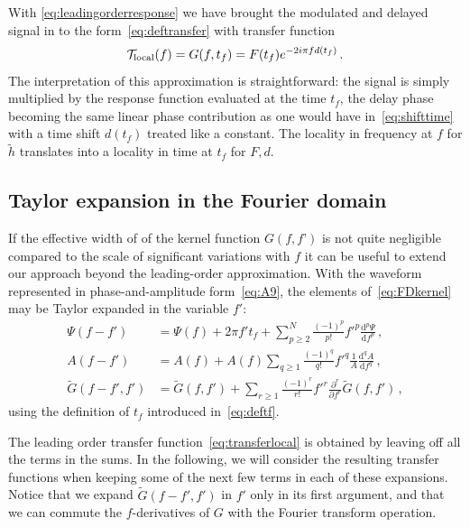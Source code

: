 \documentclass[aps,showpacs,twocolumn,
prd,superscriptaddress,nofootinbib]{revtex4-1}
\newcommand{\be}{\begin{equation}}
\newcommand{\ee}{\end{equation}}
\newcommand\ud{{\mathrm{d}}}
\newcommand\calT{{\mathcal{T}}}
\newcommand{\tf}{t_{f}}
\newcommand{\jgb}[1]{{\color{DarkGreen} #1}}
\begin{document}
\jgb{With \eqref{eq:leadingorderresponse} we have brought the modulated and delayed signal in to the form~\eqref{eq:deftransfer} with transfer function}
\be\label{eq:transferlocal}
	\calT_{\rm local}(f) = G(f, \tf) = F(t_{f}) e^{-2i\pi f d(t_{f})}\,.
\ee
The interpretation of this approximation is straightforward: the signal is simply multiplied by the response function evaluated at the time $\tf$, the delay phase becoming the same linear phase contribution as one would have in~\eqref{eq:shifttime} with a time shift $d(t_{f})$ treated like a constant. The locality in frequency at $f$ for $\tilde{h}$ translates into a locality in time at $t_{f}$ for $F,d$.


\subsection{Taylor expansion in the Fourier domain}
\label{subsec:TaylorFD}

\jgb{If the effective width of of the kernel function $G(f,f’)$ is not quite negligible compared to the scale of significant variations with $f$ it can be useful to extend our approach beyond the leading-order approximation. With the waveform represented in phase-and-amplitude form~\eqref{eq:A9}, the elements of~\eqref{eq:FDkernel} may be Taylor expanded in the variable $f'$:
\begin{subequations}\label{eq:expandfprime}
\begin{align}
	\Psi(f-f') &= \Psi(f) + 2\pi f' \tf + \sum\limits_{p\geq 2}^{N} \frac{(-1)^{p}}{p!} {f'}^{p} \frac{\ud^{p} \Psi}{\ud f^{p}} \,, \label{eq:expandPsi}\\
	A(f-f') &= A(f)+A(f) \sum\limits_{q\geq 1} \frac{(-1)^{q}}{q!} {f'}^{q} \frac{1}{A}\frac{\ud^{q} A}{\ud f^{q}} \,, \label{eq:expandA}\\
	\tilde{G}(f-f', f') &=\tilde G(f,f')+ \sum\limits_{r\geq 1} \frac{(-1)^{r}}{r!} {f'}^{r} \frac{\partial^{r} }{\partial f^{r}}  \tilde{G}(f,f') \label{eq:expandG} \,,
\end{align}
\end{subequations}
using the definition of $t_{f}$ introduced in~\eqref{eq:deftf}.}

\jgb{The leading order transfer function~\eqref{eq:transferlocal} is obtained by leaving off all the terms in the sums.  In the following, we will consider the resulting transfer functions when keeping some of the next few terms in each of these expansions.} 
Notice that we expand $\tilde{G}(f-f',f')$ in $f'$ only in its first argument, and that we can commute the $f$-derivatives of $G$ with the Fourier transform operation.
\end{document}
